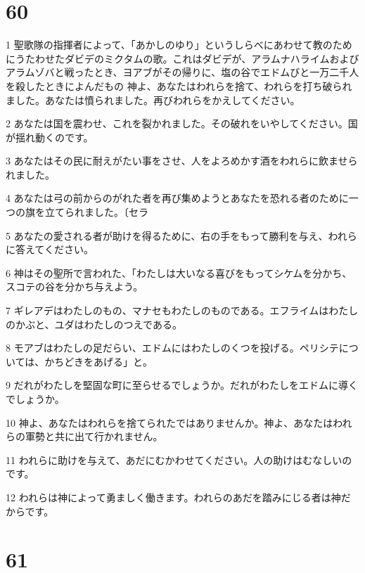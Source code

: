 \chapter{60}

\par 1 聖歌隊の指揮者によって、「あかしのゆり」というしらべにあわせて教のためにうたわせたダビデのミクタムの歌。これはダビデが、アラムナハライムおよびアラムゾバと戦ったとき、ヨアブがその帰りに、塩の谷でエドムびと一万二千人を殺したときによんだもの 神よ、あなたはわれらを捨て、われらを打ち破られました。あなたは憤られました。再びわれらをかえしてください。
\par 2 あなたは国を震わせ、これを裂かれました。その破れをいやしてください。国が揺れ動くのです。
\par 3 あなたはその民に耐えがたい事をさせ、人をよろめかす酒をわれらに飲ませられました。
\par 4 あなたは弓の前からのがれた者を再び集めようとあなたを恐れる者のために一つの旗を立てられました。〔セラ
\par 5 あなたの愛される者が助けを得るために、右の手をもって勝利を与え、われらに答えてください。
\par 6 神はその聖所で言われた、「わたしは大いなる喜びをもってシケムを分かち、スコテの谷を分かち与えよう。
\par 7 ギレアデはわたしのもの、マナセもわたしのものである。エフライムはわたしのかぶと、ユダはわたしのつえである。
\par 8 モアブはわたしの足だらい、エドムにはわたしのくつを投げる。ペリシテについては、かちどきをあげる」と。
\par 9 だれがわたしを堅固な町に至らせるでしょうか。だれがわたしをエドムに導くでしょうか。
\par 10 神よ、あなたはわれらを捨てられたではありませんか。神よ、あなたはわれらの軍勢と共に出て行かれません。
\par 11 われらに助けを与えて、あだにむかわせてください。人の助けはむなしいのです。
\par 12 われらは神によって勇ましく働きます。われらのあだを踏みにじる者は神だからです。

\chapter{61}

